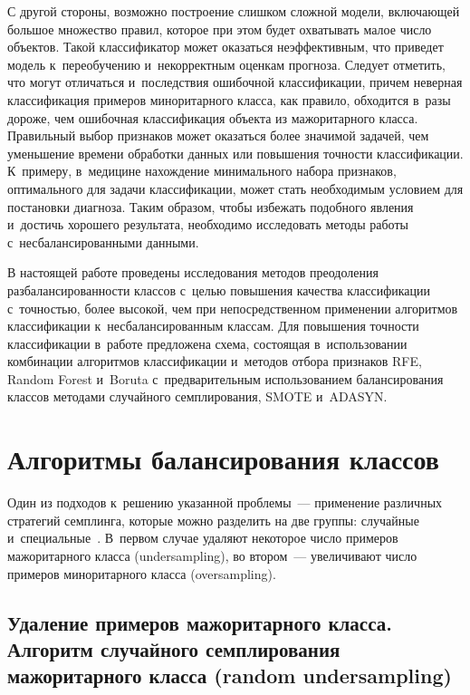 \begin{multicols}{2}
  С другой стороны, возможно построение слишком сложной модели, 
включающей большое мно\-же\-ство правил, которое при этом будет охватывать\linebreak 
малое число объектов. Такой классификатор может оказаться неэффективным, 
что приведет модель к~переобучению и~некорректным оценкам прогноза. 
Следует отметить, что могут отличаться и~последствия ошибочной 
классификации, причем неверная классификация примеров миноритарного 
класса, как правило, обходится в~разы дороже, чем ошибочная классификация 
объекта из мажоритарного класса. Правильный выбор признаков может 
оказаться более значимой задачей, чем уменьшение времени обработки данных 
или повышения точности классификации. К~примеру, в~медицине нахождение 
минимального набора признаков, оптимального для задачи классификации, 
может стать необходимым условием для постановки диагноза. Таким образом, 
чтобы избежать подобного явления и~достичь хорошего результата, 
необходимо исследовать методы работы с~несбалансированными данными.
  
  В настоящей работе проведены исследования методов преодоления 
разбалансированности классов с~целью повышения качества классификации 
с~точ\-ностью, более высокой, чем при непосредственном применении 
алгоритмов классификации к~несбалансированным классам. Для повышения 
точности классификации в~работе предложена схема, состоящая 
в~использовании комбинации алгоритмов классификации и~методов отбора 
признаков RFE, Random Forest и~Boruta с~предварительным использованием 
балансирования классов методами случайного семплирования, SMOTE 
и~ADASYN.

  
\section{Алгоритмы балансирования классов}

  Один из подходов к~решению указанной проблемы~--- применение различных 
стратегий семплинга, которые можно разделить на две группы: случайные 
и~специальные~\cite{3-sev}. В~первом случае удаляют некоторое число 
примеров мажоритарного класса (undersampling), во втором~--- увеличивают 
число примеров миноритарного класса (oversampling). 

  
\subsection{Удаление примеров мажоритарного класса. Алгоритм 
случайного семплирования мажоритарного класса (random 
undersampling)}


\end{multicols}
